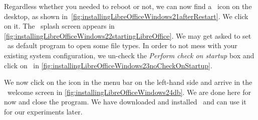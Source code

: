 Regardless whether you needed to reboot or not, we can now find a \libreoffice\ icon on the desktop, as shown in~\cref{fig:installingLibreOfficeWindows21afterRestart}.
We click on it.
The \libreoffice\ splash screen appears in \cref{fig:installingLibreOfficeWindows22startingLibreOffice}.
We may get asked to set \libreoffice\ as default program to open some file types.
In order to not mess with your existing system configuration, we un-check the \emph{Perform check on startup} box and click on~ in \cref{fig:installingLibreOfficeWindows23noCheckOnStartup}.

We now click on the  icon in the menu bar on the left-hand side and arrive in the \libreofficeBase\ welcome screen in \cref{fig:installingLibreOfficeWindows24db}.
We are done here for now and close the program.
We have downloaded and installed \libreofficeBase\ and can use it for our experiments later.%
%
\FloatBarrier%
\endhsection%
%
